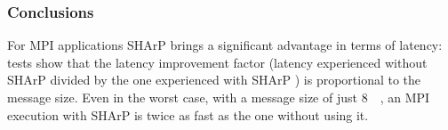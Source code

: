 \subsubsection{Conclusions}
For MPI \cite{mpi} applications SHArP \cite{sharp} brings a significant advantage in terms of latency: tests show that the latency improvement factor (latency experienced without SHArP \cite{sharp} divided by the one experienced with SHArP \cite{sharp}) is proportional to the message size.
Even in the worst case, with a message size of just \SI{8}{\mega\byte}, an MPI \cite{mpi} execution with SHArP \cite{sharp} is twice as fast as the one without using it.